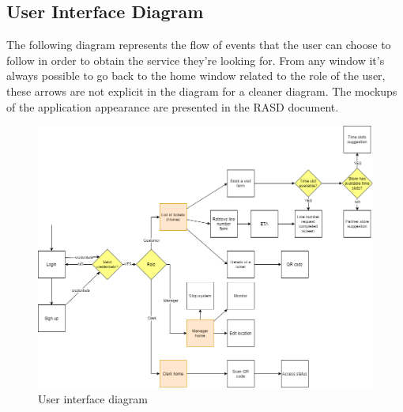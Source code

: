 \subsection{User Interface Diagram}
The following diagram represents the flow of events that the user can choose to follow in order to obtain the service they're looking for.
From any window it's always possible to go back to the home window related to the role of the user, these arrows are not explicit in the diagram for a cleaner diagram.
The mockups of the application appearance are presented in the RASD document.

\begin{figure}[H]
    \centering
    \includegraphics[height=0.6\textwidth]{Images/UXDiagram.png}
    \caption{User interface diagram}
\end{figure}
